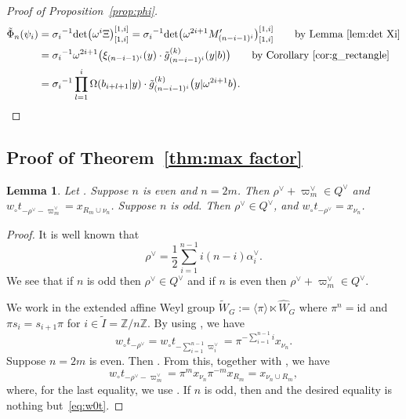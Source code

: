 \documentclass[pdftex]{sigma}
\numberwithin{equation}{section}
\newcommand{\co}{\xi}
\newcommand{\Z}{\mathbb{Z}}
\newcommand{\fac}{\psi}
\newtheorem{Lemma}[Theorem]{Lemma}
\theoremstyle{definition}
\begin{document}
\begin{proof}
[Proof of Proposition~\ref{prop:phi}]
\begin{align*}
\tilde{\Phi}_n(\fac_i)&=
{\sigma_i}^{-1}{\det}\bigl(\omega^{i} \Xi\bigr)^{[1,i]}_{[1,i]}={\sigma_i}^{-1}{\det}\bigl(\omega^{2i+1} M'_{(n-i-1)^i}\bigr)^{[1,i]}_{[1,i]} \qquad\text{by Lemma~\ref{lem:det Xi}}\\
&={\sigma_i}^{-1}
\omega^{2i+1}\bigl({\co_{(n-i-1)^i}(y)}\cdot{\tilde{g}^{(k)}_{(n-i-1)^i}(y|b)}\bigr)\qquad\text{by Corollary~\ref{cor:g_rectangle}}\\
&={\sigma_i}^{-1}\prod_{l=1}^i\Omega(b_{i+l+1}|y)\cdot\tilde{g}^{(k)}_{(n-i-1)^i}\bigl(y|\omega^{2i+1}b\bigr).\tag*{\qed}
\end{align*}\renewcommand{\qed}{}
\end{proof}

\subsection{Proof of Theorem~\ref{thm:max factor}}
\begin{Lemma}\label{lem:rho check}
Let .
Suppose $n$ is even and $n=2m$. Then
$\rho^\lor+\varpi_m^\lor\in Q^{\lor}$ and
$
w_\circ t_{-\rho^\lor-\varpi_m^\lor}
=x_{R_m\cup \nu_n}$.
Suppose $n$ is odd. Then $\rho^\lor\in Q^{\lor}$, and
$
w_\circ t_{-\rho^\lor}
=x_{\nu_n}$.
\end{Lemma}
\begin{proof}
It is well known that
\begin{equation}\label{eq:rho check}
\rho^\lor=\frac{1}{2}\sum_{i=1}^{n-1
}i(n-i)\alpha_i^\lor.
\end{equation}
We see that if $n$ is odd then $\rho^\lor\in Q^\lor$
and if $n$ is even then
$\rho^\lor+\varpi_m^\lor\in Q^\lor$.


We work in the extended affine Weyl group $\tilde{W}_G:=\langle \pi\rangle\ltimes \hat{W}_G$
where $\pi^n=\mathrm{id}$ and $\pi s_i=s_{i+1}\pi$ for $i\in \tilde{I}=\Z/n\Z$.
By using \cite[Lemma 4.6]{IIN}, we have
\begin{equation}
\label{eq:w0t}
w_\circ t_{-\rho^\lor}=
w_\circ t_{-\sum_{i=1}^{n-1}\varpi_i^\lor}=
\pi^{-\sum_{i=1}^{n-1}i}x_{\nu_n}.
\end{equation}
Suppose $n=2m$ is even.
Then .
From this, together with
,
we have
\[
w_\circ t_{-\rho^\lor-\varpi_m^\lor}
=\pi^{m}x_{\nu_n}\pi^{-m} x_{R_m}
=x_{\nu_n\cup R_m},
\]
where, for the last equality, we use \cite[Lem\-ma~2.15]{Tak}.
If $n$ is odd, then
 and the desired equality is nothing but~\eqref{eq:w0t}.
\end{proof}
\end{document}
